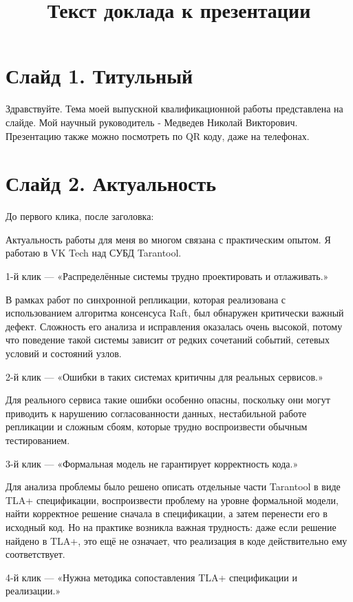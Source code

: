 \documentclass[12pt,a4paper]{article}
\title{Текст доклада к презентации}
\author{}
\date{}
\begin{document}
\maketitle

\section*{Слайд 1. Титульный}

Здравствуйте. Тема моей выпускной квалификационной работы представлена на
слайде. Мой научный руководитель - Медведев Николай Викторович. Презентацию
также можно посмотреть по QR коду, даже на телефонах.

\section*{Слайд 2. Актуальность}

До первого клика, после заголовка:

Актуальность работы для меня во многом связана с практическим опытом.
Я работаю в VK Tech над СУБД Tarantool.

1-й клик — «Распределённые системы трудно проектировать и отлаживать.»

В рамках работ по синхронной репликации, которая реализована с
использованием алгоритма консенсуса Raft, был обнаружен критически
важный дефект. Сложность его анализа и исправления оказалась очень
высокой, потому что поведение такой системы зависит от редких сочетаний
событий, сетевых условий и состояний узлов.

2-й клик — «Ошибки в таких системах критичны для реальных сервисов.»

Для реального сервиса такие ошибки особенно опасны, поскольку они могут
приводить к нарушению согласованности данных, нестабильной работе
репликации и сложным сбоям, которые трудно воспроизвести обычным
тестированием.

3-й клик — «Формальная модель не гарантирует корректность кода.»

Для анализа проблемы было решено описать отдельные части Tarantool в
виде TLA+ спецификации, воспроизвести проблему на уровне формальной
модели, найти корректное решение сначала в спецификации, а затем
перенести его в исходный код. Но на практике возникла важная
трудность: даже если решение найдено в TLA+, это ещё не означает, что
реализация в коде действительно ему соответствует.

4-й клик — «Нужна методика сопоставления TLA+ спецификации и реализации.»
\end{document}
